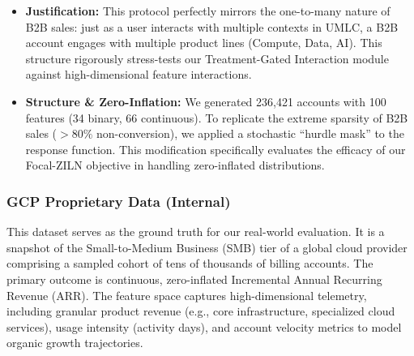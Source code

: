 \documentclass[runningheads]{llncs}
\begin{document}
\begin{itemize}
    \item \textbf{Justification:} This protocol perfectly mirrors the one-to-many nature of B2B sales: just as a user interacts with multiple contexts in UMLC, a B2B account engages with multiple product lines (Compute, Data, AI). This structure rigorously stress-tests our Treatment-Gated Interaction module against high-dimensional feature interactions.
    
    \item \textbf{Structure \& Zero-Inflation:} We generated 236,421 accounts with 100 features (34 binary, 66 continuous). To replicate the extreme sparsity of B2B sales ($>80\%$ non-conversion), we applied a stochastic ``hurdle mask'' to the response function. This modification specifically evaluates the efficacy of our Focal-ZILN objective in handling zero-inflated distributions.
\end{itemize}

\subsubsection{GCP Proprietary Data (Internal)}
This dataset serves as the ground truth for our real-world evaluation. It is a snapshot of the Small-to-Medium Business (SMB) tier of a global cloud provider comprising a sampled cohort of tens of thousands of billing accounts. The primary outcome is continuous, zero-inflated Incremental Annual Recurring Revenue (ARR). The feature space captures high-dimensional telemetry, including granular product revenue (e.g., core infrastructure, specialized cloud services), usage intensity (activity days), and account velocity metrics to model organic growth trajectories.
    


\end{document}
